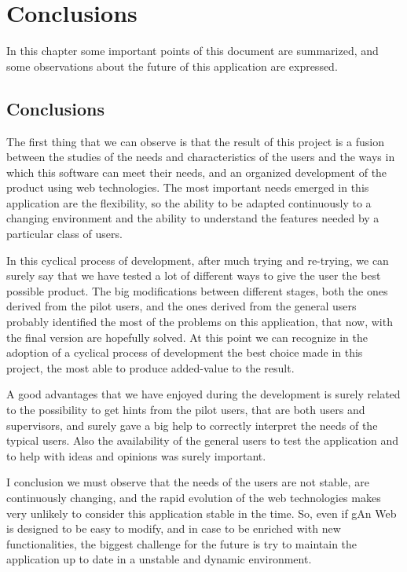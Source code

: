 
\chapter{Conclusions} %

\label{Chapter 10} %


In this chapter some important points of this document are summarized, and some observations about the future of this application are expressed.

\section{Conclusions}
The first thing that we can observe is that the result of this project is a fusion between the studies of the needs and characteristics of the users and the ways in which this software can meet their needs, and an organized development of the product using web technologies. The most important needs emerged in this application are the flexibility, so the ability to be adapted continuously to a changing environment and the ability to understand the features needed by a particular class of users.


In this cyclical process of development, after much trying and re-trying, we can surely say that we have tested a lot of different ways to give the user the best possible product. The big modifications between different stages, both the ones derived from the pilot users, and the ones derived from the general users probably identified the most of the problems on this application, that now, with the final version are hopefully solved. At this point we can recognize in the adoption of a cyclical process of development the best choice made in this project, the most able to produce added-value to the result.

A good advantages that we have enjoyed during the development is surely related to the possibility to get hints from the pilot users, that are both users and supervisors, and surely gave a big help to correctly interpret the needs of the typical users. Also the availability of the general users to test the application and to help with ideas and opinions was surely important.

I conclusion we must observe that the needs of the users are not stable, are continuously changing, and the rapid evolution of the web technologies makes very unlikely to consider this application stable in the time. So, even if gAn Web is designed to be easy to modify, and in case to be enriched with new functionalities, the biggest challenge for the future is try to maintain the application up to date in a unstable and dynamic environment.  

